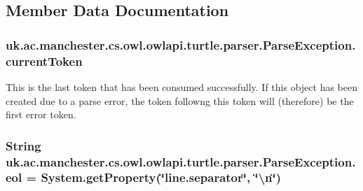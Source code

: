 \subsection{Member Data Documentation}
\hypertarget{classuk_1_1ac_1_1manchester_1_1cs_1_1owl_1_1owlapi_1_1turtle_1_1parser_1_1_parse_exception_a3a9b65aacfb71f6029fd7fd37fdcc633}{
\subsubsection[{current\-Token}]{ uk.\-ac.\-manchester.\-cs.\-owl.\-owlapi.\-turtle.\-parser.\-Parse\-Exception.\-current\-Token}}\label{classuk_1_1ac_1_1manchester_1_1cs_1_1owl_1_1owlapi_1_1turtle_1_1parser_1_1_parse_exception_a3a9b65aacfb71f6029fd7fd37fdcc633}
This is the last token that has been consumed successfully. If this object has been created due to a parse error, the token followng this token will (therefore) be the first error token. \hypertarget{classuk_1_1ac_1_1manchester_1_1cs_1_1owl_1_1owlapi_1_1turtle_1_1parser_1_1_parse_exception_a93dac0f8ebcb3f59141c01d54a3da3c1}{
\subsubsection[{eol}]{\setlength{\rightskip}{0pt plus 5cm}String uk.\-ac.\-manchester.\-cs.\-owl.\-owlapi.\-turtle.\-parser.\-Parse\-Exception.\-eol = System.\-get\-Property(\char`\"{}line.\-separator\char`\"{}, \char`\"{}\textbackslash{}n\char`\"{})\hspace{0.3cm}{\ttfamily [protected]}}}\label{classuk_1_1ac_1_1manchester_1_1cs_1_1owl_1_1owlapi_1_1turtle_1_1parser_1_1_parse_exception_a93dac0f8ebcb3f59141c01d54a3da3c1}
